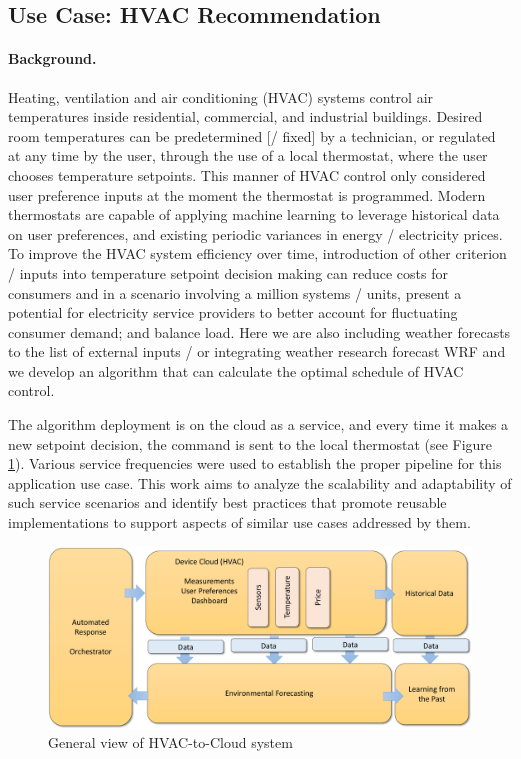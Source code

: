 \subsection{Use Case: HVAC Recommendation}

\paragraph*{Background.}
Heating, ventilation and air conditioning (HVAC) systems control air temperatures inside residential, commercial, and industrial  buildings. 
Desired room temperatures can be predetermined [/ fixed] by a technician, or regulated at any time by the user, through the use of a local thermostat, where the user chooses temperature setpoints. This manner of  HVAC control only considered user preference inputs at the moment the thermostat is programmed. Modern thermostats are capable of applying machine learning to leverage historical data on user preferences, and existing periodic variances in energy / electricity prices. To improve the HVAC system efficiency over time, introduction of other criterion / inputs into temperature setpoint decision making can reduce costs for consumers and in a scenario involving a million systems / units, present a potential for electricity service providers to better account for fluctuating consumer demand; and balance load. Here we are also including weather forecasts to the list of external inputs / or integrating weather research forecast WRF and we develop an algorithm that can calculate the optimal schedule of HVAC control. 

The algorithm deployment is on the cloud as a service, and every time it makes a new setpoint decision, the command is sent to the local thermostat (see Figure \ref{fig:hvac_general}). Various service frequencies were used to establish the proper pipeline for this application use case. This work aims to analyze the scalability and adaptability of such service scenarios and identify best practices that promote reusable implementations to support aspects of similar use cases addressed by them.

\begin{figure}[htb]
\centering\includegraphics[width=1.0\columnwidth]{usecase/images/nist-hvac-layer.pdf}
\caption{General view of HVAC-to-Cloud system}
\label{fig:hvac_general}
\end{figure}

